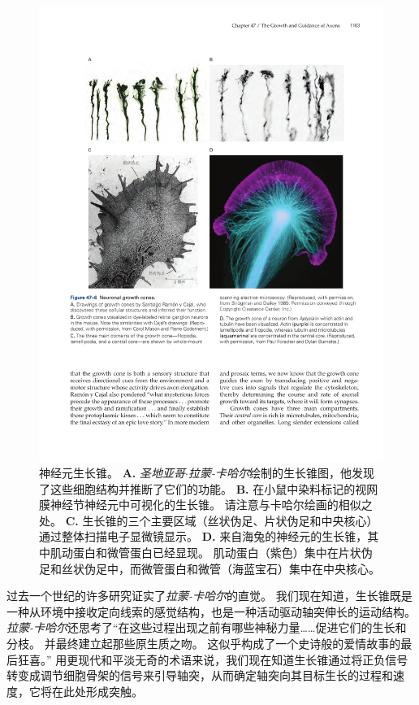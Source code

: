\begin{figure}[htbp]
	\centering
	\includegraphics[width=1.0\linewidth]{chap47/fig_47_6}
	\caption{神经元生长锥。
		\textbf{A.} \textit{圣地亚哥$\cdot$拉蒙-卡哈尔}绘制的生长锥图，他发现了这些细胞结构并推断了它们的功能。
		\textbf{B.} 在小鼠中染料标记的视网膜神经节神经元中可视化的生长锥。
		请注意与卡哈尔绘画的相似之处。
		\textbf{C.} 生长锥的三个主要区域（丝状伪足、片状伪足和中央核心）通过整体扫描电子显微镜显示。
		\textbf{D.} 来自海兔的神经元的生长锥，其中肌动蛋白和微管蛋白已经显现。
		肌动蛋白（紫色）集中在片状伪足和丝状伪足中，而微管蛋白和微管（海蓝宝石）集中在中央核心。}
	\label{fig:47_6}
\end{figure}


过去一个世纪的许多研究证实了\textit{拉蒙-卡哈尔}的直觉。
我们现在知道，生长锥既是一种从环境中接收定向线索的感觉结构，也是一种活动驱动轴突伸长的运动结构。
\textit{拉蒙-卡哈尔}还思考了“在这些过程出现之前有哪些神秘力量……促进它们的生长和分枝。
并最终建立起那些原生质之吻。
这似乎构成了一个史诗般的爱情故事的最后狂喜。” 
用更现代和平淡无奇的术语来说，我们现在知道生长锥通过将正负信号转变成调节细胞骨架的信号来引导轴突，从而确定轴突向其目标生长的过程和速度，它将在此处形成突触。


